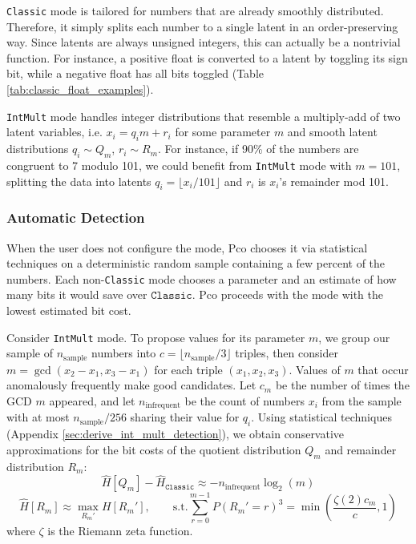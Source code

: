 \documentclass[letterpaper]{article}
\begin{document}
\texttt{Classic} mode is tailored for numbers that are already smoothly distributed.
Therefore, it simply splits each number to a single latent in an order-preserving way.
Since latents are always unsigned integers, this can actually be a nontrivial function.
For instance, a positive float is converted to a latent by toggling its sign bit, while a negative float has all bits toggled (Table \ref{tab:classic_float_examples}).

\texttt{IntMult} mode handles integer distributions that resemble a multiply-add of two latent variables, i.e. $x_i = q_im + r_i$ for some parameter $m$ and smooth latent distributions $q_i \sim Q_m$, $r_i \sim R_m$.
For instance, if 90\% of the numbers are congruent to 7 modulo 101, we could benefit from \texttt{IntMult} mode with $m = 101$, splitting the data into latents $q_i = \lfloor x_i / 101\rfloor$ and $r_i$ is $x_i$'s remainder mod 101.

\subsubsection{Automatic Detection}

When the user does not configure the mode, Pco chooses it via statistical techniques on a deterministic random sample containing a few percent of the numbers.
Each non-\texttt{Classic} mode chooses a parameter and an estimate of how many bits it would save over $\texttt{Classic}$.
Pco proceeds with the mode with the lowest estimated bit cost.

Consider \texttt{IntMult} mode.
To propose values for its parameter $m$, we group our sample of $n_\text{sample}$ numbers into $c = \lfloor n_\text{sample} / 3\rfloor$ triples, then consider $m = \gcd(x_2 - x_1, x_3 - x_1)$ for each triple $(x_1, x_2, x_3)$.
Values of $m$ that occur anomalously frequently make good candidates.
Let $c_m$ be the number of times the GCD $m$ appeared, and let $n_\text{infrequent}$ be the count of numbers $x_i$ from the sample with at most $n_\text{sample} / 256$ sharing their value for $q_i$.
Using statistical techniques (Appendix \ref{sec:derive_int_mult_detection}), we obtain conservative approximations for the bit costs of the quotient distribution $Q_m$ and remainder distribution $R_m$:
\[\hat{H}[Q_m] - \hat{H}_\texttt{Classic} \approx -n_\text{infrequent} \log_2\left(m\right)\]
\[\hat{H}[R_m] \approx \max_{R_m'}H[R_m'], \qquad \text{s.t.} \sum_{r=0}^{m-1} P(R_m' = r)^3 = \min\left(\frac{\zeta(2) c_m}{c}, 1\right)\]
where $\zeta$ is the Riemann zeta function.
\end{document}
